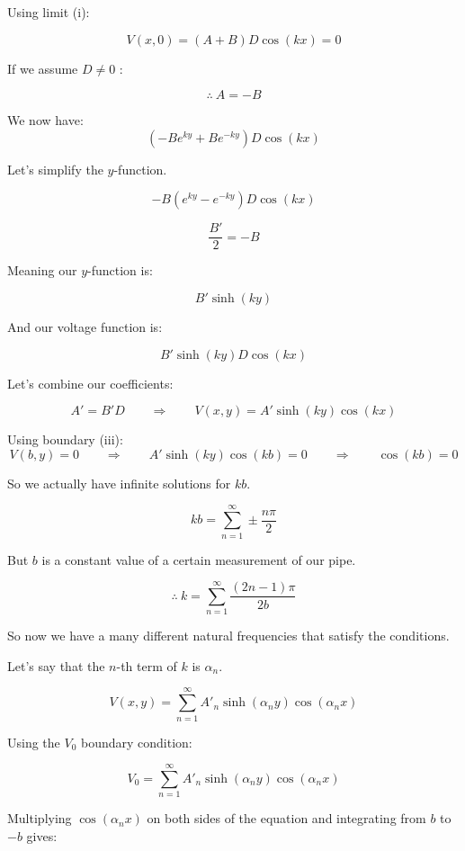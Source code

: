 \documentclass{article}
\begin{document}
Using limit (i): 


\[%
    V(x,0) 
    =
    (A+B)D  \cos\left(kx\right) 
    =
    0
\]%

If we assume $D \neq 0$ :

\[%
     \therefore  \ 
    A = -B
\]%

We now have: 
\[%
    (-Be^{ky} + B e^{-ky}) D \cos\left(kx\right) 
\]%

Let's simplify the $y$-function.
 
\[%
    -B(e^{ky}- e^{-ky})D \cos\left(kx\right) 
\]%


\[%
    \frac{B'}{2}
    =
    -B
\]%

Meaning our $y$-function is:

\[%
    B'\sinh (ky)
\]%

And our voltage function is:


\[%
    B'\sinh (ky)
    D \cos\left(kx\right) 
\]%

Let's combine our coefficients:

\[%
    A' 
    =
    B'D 
    \qquad
    \Rightarrow 
    \qquad
    V(x,y)
    = 
    A' \sinh(ky) \cos\left(kx\right) 
\]%

Using boundary (iii):
\[%
    V(b,y)
    =
    0
    \qquad
    \Rightarrow 
    \qquad
    A' \sinh(ky) \cos\left(kb\right) 
    =
    0 
    \qquad
    \Rightarrow 
    \qquad
    \cos\left(kb\right) 
    =
    0
\]%

So we actually have infinite solutions for $kb$.


\[%
    kb 
    =
    \sum_{n=1}^{\infty} \pm \frac{n {\pi}}{2}
\]%

But $b$ is a constant value of a certain measurement of our pipe.
 
\[%
     \therefore \ k = \sum_{n=1}^{\infty} \frac{(2n-1)\pi}{2b}
\]%

So now we have a many different natural frequencies that satisfy the conditions.

Let's say that the $n$-th term of $k$ is $\alpha_n$.

\[%
    V(x,y) 
    =
    \sum_{n=1}^{\infty} A'_{n} \sinh\left(\alpha_n y\right) \cos\left(\alpha_n x\right) 
\]%

Using the $V_0$ boundary condition:


\[%
    V_0 
    =
    \sum_{n=1}^{\infty} A'_{n} \sinh\left(\alpha_n y\right) \cos\left(\alpha_n x\right) 
\]%

Multiplying $\cos (\alpha_n x)$ on both sides of the equation and integrating
from $b$ to $-b$ gives:
\end{document}

